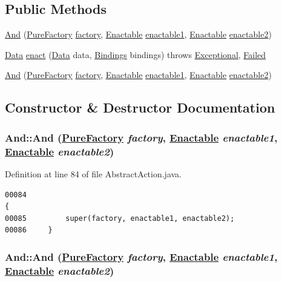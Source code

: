 \subsection*{Public Methods}
\begin{CompactItemize}
\item 
\hyperlink{classAnd_a0}{And} (\hyperlink{classPureFactory}{Pure\-Factory} \hyperlink{classDataImpl_o0}{factory}, \hyperlink{interfaceEnactable}{Enactable} \hyperlink{classAbstractInfixCombinator_o0}{enactable1}, \hyperlink{interfaceEnactable}{Enactable} \hyperlink{classAbstractInfixCombinator_o1}{enactable2})
\item 
\hyperlink{interfaceData}{Data} \hyperlink{classAnd_a1}{enact} (\hyperlink{interfaceData}{Data} data, \hyperlink{interfaceBindings}{Bindings} bindings) throws \hyperlink{classExceptional}{Exceptional}, \hyperlink{classFailed}{Failed}
\item 
\hyperlink{classAnd_a2}{And} (\hyperlink{classPureFactory}{Pure\-Factory} \hyperlink{classDataImpl_o0}{factory}, \hyperlink{interfaceEnactable}{Enactable} \hyperlink{classAbstractInfixCombinator_o0}{enactable1}, \hyperlink{interfaceEnactable}{Enactable} \hyperlink{classAbstractInfixCombinator_o1}{enactable2})
\end{CompactItemize}


\subsection{Constructor \& Destructor Documentation}
\hypertarget{classAnd_a0}{
\subsubsection[And]{\setlength{\rightskip}{0pt plus 5cm}And::And (\hyperlink{classPureFactory}{Pure\-Factory} {\em factory}, \hyperlink{interfaceEnactable}{Enactable} {\em enactable1}, \hyperlink{interfaceEnactable}{Enactable} {\em enactable2})}}
\label{classAnd_a0}




Definition at line 84 of file Abstract\-Action.java.\footnotesize\begin{verbatim}00084                                                                                 {
00085         super(factory, enactable1, enactable2);
00086     }
\end{verbatim}\normalsize 
\hypertarget{classAnd_a2}{
\subsubsection[And]{\setlength{\rightskip}{0pt plus 5cm}And::And (\hyperlink{classPureFactory}{Pure\-Factory} {\em factory}, \hyperlink{interfaceEnactable}{Enactable} {\em enactable1}, \hyperlink{interfaceEnactable}{Enactable} {\em enactable2})}}
\label{classAnd_a2}





